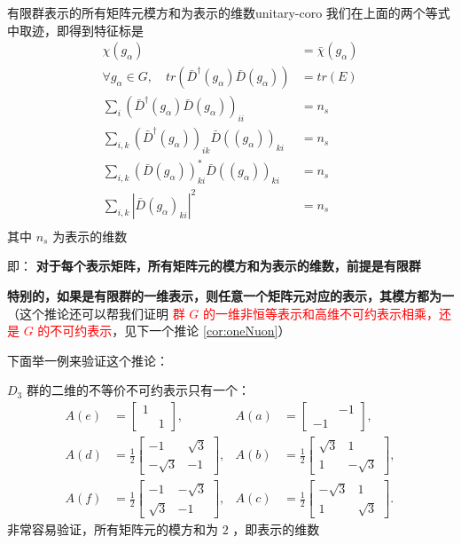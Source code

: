 \begin{corollary}{有限群表示的所有矩阵元模方和为表示的维数}{unitary-coro}
  我们在上面的两个等式中取迹，即得到特征标是
  \begin{equation}
    \begin{aligned}
    \chi(g_{\alpha})&=\bar{\chi}(g_{\alpha}) \\
        \forall g_\alpha \in G, \quad tr(\bar{D}^\dagger(g_\alpha)\bar{D}(g_\alpha)) &= tr(E)\\
        \sum_{i}(\bar{D}^\dagger(g_\alpha)\bar{D}(g_\alpha))_{ii}&=n_{s}\\
        \sum_{i,k}(\bar{D}^\dagger(g_\alpha))_{ik}\bar{D}((g_\alpha))_{ki}&=n_{s}\\
        \sum_{i,k}(\bar{D}(g_\alpha))_{ki}^{*}\bar{D}((g_\alpha))_{ki}&=n_{s}\\
        \sum_{i,k}|\bar{D}(g_\alpha)_{ki}|^{2}&=n_{s}\\
    \end{aligned}
  \end{equation}
  其中 $n_{s}$ 为表示的维数

  即： \textbf{对于每个表示矩阵，所有矩阵元的模方和为表示的维数，前提是有限群}

  \textbf{特别的，如果是有限群的一维表示，则任意一个矩阵元对应的表示，其模方都为一}（这个推论还可以帮我们证明 \textcolor{red}{群 $G$ 的一维非恒等表示和高维不可约表示相乘，还是 $G$ 的不可约表示}，见下一个推论 \ref{cor:oneNuon}）
\end{corollary}
下面举一例来验证这个推论：
\begin{example}
  $D_3$ 群的二维的不等价不可约表示只有一个：
    \begin{equation}
        \begin{aligned}
            A(e) &= \begin{bmatrix} 1 & \\ & 1 \end{bmatrix}, &
            A(a) &= \begin{bmatrix} & -1 \\ -1 & \end{bmatrix}, \\
            A(d) &= \frac{1}{2} \begin{bmatrix} -1 & \sqrt{3} \\ -\sqrt{3} & -1 \end{bmatrix}, &
            A(b) &= \frac{1}{2} \begin{bmatrix} \sqrt{3} & 1 \\ 1 & -\sqrt{3} \end{bmatrix}, \\
            A(f) &= \frac{1}{2} \begin{bmatrix} -1 & -\sqrt{3} \\ \sqrt{3} & -1 \end{bmatrix}, &
            A(c) &= \frac{1}{2} \begin{bmatrix} -\sqrt{3} & 1 \\ 1 & \sqrt{3} \end{bmatrix}.
        \end{aligned}
    \end{equation}
    非常容易验证，所有矩阵元的模方和为 $2$ ，即表示的维数
\end{example}

